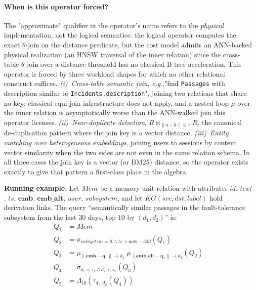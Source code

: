 \documentclass[sigconf]{acmart}
\theoremstyle{plain}
\theoremstyle{definition}
\newcommand{\vect}[1]{\boldsymbol{#1}}
\newcommand{\Mem}{\mathit{Mem}}
\newcommand{\KG}{\mathit{KG}}
\newcommand{\eg}{\emph{e.g.,}\xspace}
\theoremstyle{remark}
\begin{document}
\paragraph{When is this operator forced?}
The "approximate" qualifier in the operator's name refers to the \emph{physical} implementation, not the logical semantics: the logical operator computes the exact $\theta$-join on the distance predicate, but the cost model admits an ANN-backed physical realization (an HNSW traversal of the inner relation) since the cross-table $\theta$-join over a distance threshold has no classical B-tree acceleration. This operator is forced by three workload shapes for which no other relational construct suffices. \emph{(i)~Cross-table semantic join}, \eg "find \texttt{Passages} with description similar to \texttt{Incidents.description}", joining two relations that share no key; classical equi-join infrastructure does not apply, and a nested-loop $\mu$ over the inner relation is asymptotically worse than the ANN-walked join this operator licenses. \emph{(ii)~Near-duplicate detection}, $R \bowtie_{\lVert a-b\rVert \le \tau} R$, the canonical de-duplication pattern where the join key is a vector distance. \emph{(iii)~Entity matching over heterogeneous embeddings}, joining users to sessions by content vector similarity when the two sides are not even in the same relation schema. In all three cases the join key is a vector (or BM25) distance, so the operator exists exactly to give that pattern a first-class place in the algebra.

\textbf{Running example.} Let $\Mem$ be a memory-unit relation with attributes $\mathit{id}$, $\mathit{text}$, $\mathit{ts}$, $\vect{emb}$, $\vect{emb\_alt}$, $\mathit{user}$, $\mathit{subsystem}$, and let $\KG(\mathit{src}, \mathit{dst}, \mathit{label})$ hold derivation links. The query ``semantically similar passages in the
fault-tolerance subsystem from the last 30 days, top 10 by $(d_1, d_2)$'' is:
\begin{align*}
Q_1 &= \Mem \\
Q_2 &= \sigma_{\mathit{subsystem}=\mathrm{ft} \wedge
         \mathit{ts} > \mathrm{now}-30d}(Q_1) \\
Q_3 &= \mu_{\lVert\vect{emb}-\vect{q}_1\rVert\to d_1}\;
        \mu_{\lVert\vect{emb\_alt}-\vect{q}_2\rVert\to d_2}(Q_2) \\
Q_4 &= \sigma_{d_1<\tau_1 \wedge d_2<\tau_2}(Q_3) \\
Q_5 &= \Lambda_{10}(\tau_{d_1,d_2}(Q_4))
\end{align*}
\end{document}
